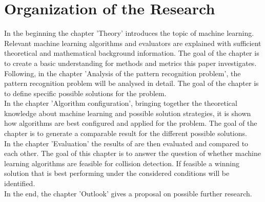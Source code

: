 \section{Organization of the Research}
In the beginning the chapter 'Theory' introduces the topic of machine learning. Relevant machine learning algorithms and evaluators are explained with sufficient theoretical and mathematical background information. The goal of the chapter is to create a basic understanding for methods and metrics this paper investigates.\\
Following, in the chapter 'Analysis of the pattern recognition problem', the pattern recognition problem will be analysed in detail. The goal of the chapter is to define specific possible solutions for the problem. \\
In the chapter 'Algorithm configuration', bringing together the theoretical knowledge about machine learning and possible solution strategies, it is shown how algorithms are best configured and applied for the problem. The goal of the chapter is to generate a comparable result for the different possible solutions. \\
In the chapter 'Evaluation' the results of are then evaluated and compared to each other. The goal of this chapter is to answer the question of whether machine learning algorithms are feasible for collision detection. If feasible a winning solution that is best performing under the considered conditions will be identified.  \\
In the end, the chapter 'Outlook' gives a proposal on possible further research.